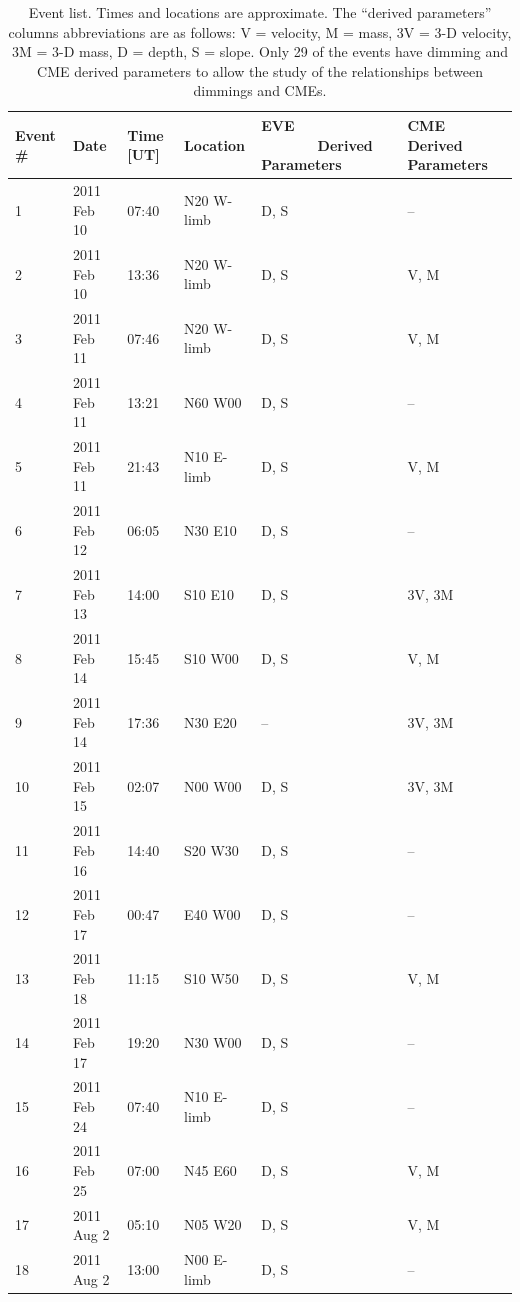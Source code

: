 \newpage
\begin{singlespace}
\begin{table}[H]
    \caption[Semi-statistical study event list]{
        Event list. Times and locations are approximate. The “derived parameters” columns abbreviations are as follows: V = 
        velocity, M = mass, 3V = 3-D velocity, 3M = 3-D mass, D = depth, S = slope. Only 29 of the events have dimming and 
        CME derived parameters to allow the study of the relationships between dimmings and CMEs.
    }
    \begin{center}
    \begin{tabular}{|l|l|l|l|p{2.0cm}|p{2.0cm}|} \hline
	Event \# & Date & Time [UT] & Location & EVE \ \ \ \ \ \ \ Derived Parameters & CME Derived Parameters \\ \hline \hline
	1 & 2011 Feb 10 & 07:40 & N20 W-limb & D, S & -- \\ \hline
	2 & 2011 Feb 10 & 13:36 & N20 W-limb & D, S & V, M  \\ \hline
	3 & 2011 Feb 11 & 07:46 & N20 W-limb & D, S & V, M \\ \hline
	4 & 2011 Feb 11 & 13:21 & N60 W00 & D, S & -- \\ \hline
	5 & 2011 Feb 11 & 21:43 & N10 E-limb & D, S & V, M \\ \hline
	6 & 2011 Feb 12 & 06:05 & N30 E10 & D, S & -- \\ \hline
	7 & 2011 Feb 13 & 14:00 & S10 E10 & D, S & 3V, 3M \\ \hline
	8 & 2011 Feb 14 & 15:45 & S10 W00 & D, S & V, M \\ \hline
	9 & 2011 Feb 14 & 17:36 & N30 E20 & -- & 3V, 3M \\ \hline
	10 & 2011 Feb 15 & 02:07 & N00 W00 & D, S & 3V, 3M \\ \hline
	11 & 2011 Feb 16 & 14:40 & S20 W30 & D, S & -- \\ \hline
	12 & 2011 Feb 17 & 00:47 & E40 W00 & D, S & -- \\ \hline
	13 & 2011 Feb 18 & 11:15 & S10 W50 & D, S & V, M \\ \hline
	14 & 2011 Feb 17 & 19:20 & N30 W00 & D, S & -- \\ \hline
	15 & 2011 Feb 24 & 07:40 & N10 E-limb & D, S & -- \\ \hline
	16 & 2011 Feb 25 & 07:00 & N45 E60 & D, S & V, M \\ \hline
	17 & 2011 Aug 2 & 05:10 & N05 W20 & D, S & V, M \\ \hline
	18 & 2011 Aug 2 & 13:00 & N00 E-limb & D, S & -- \\ \hline

\end{tabular}
\end{center}
\end{table}
\end{singlespace}
